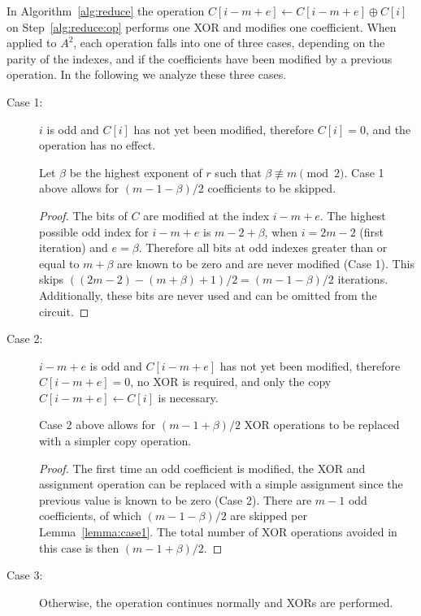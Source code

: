 In Algorithm~\ref{alg:reduce} the operation $C[i-m+e] \leftarrow C[i-m+e] \oplus C[i]$ on Step~\ref{alg:reduce:op} performs one XOR and modifies one coefficient. When applied to $A^2$, each operation falls into one of three cases, depending on the parity of the indexes, and if the coefficients have been modified by a previous operation. In the following we analyze these three cases.

\begin{description}
\item[Case 1:] $i$ is odd and $C[i]$ has not yet been modified, therefore $C[i]=0$, and the operation has no effect.
    
\begin{lem} \label{lemma:case1}
Let $\beta$ be the highest exponent of $r$ such that $\beta \not\equiv m \pmod {2}$. Case 1 above allows for $(m-1-\beta) / 2$ coefficients to be skipped.
\end{lem}

\begin{proof}
The bits of $C$ are modified at the index $i-m+e$. The highest possible odd index for $i-m+e$ is $m-2+\beta$, when $i=2m-2$ (first iteration) and $e = \beta$. Therefore all bits at odd indexes greater than or equal to $m+\beta$ are known to be zero and are never modified (Case 1). This skips $\left((2m-2) - (m+\beta) + 1\right)/2 = (m-1-\beta)/2$ iterations. Additionally, these bits are never used and can be omitted from the circuit.
\end{proof}

\item[Case 2:] $i-m+e$ is odd and $C[i-m+e]$ has not yet been modified, therefore $C[i-m+e]=0$, no XOR is required, and only the copy $C[i-m+e] \leftarrow C[i]$ is necessary.
    \begin{lem} \label{lemma:case2}
Case 2 above allows for $(m-1+\beta)/2$ XOR operations to be replaced with a simpler copy operation.
\end{lem}

\begin{proof}
The first time an odd coefficient is modified, the XOR and assignment operation can be replaced with a simple assignment since the previous value is known to be zero (Case 2). There are $m-1$ odd coefficients, of which $(m-1-\beta)/2$ are skipped per Lemma~\ref{lemma:case1}. The total number of XOR operations avoided in this case is then $(m-1+\beta)/2$.
\end{proof}

\item[Case 3:] Otherwise, the operation continues normally and XORs are performed.
\end{description}

